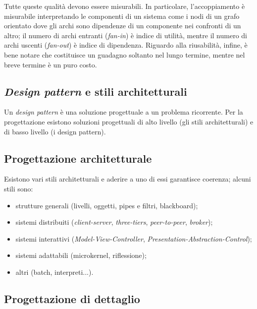 \documentclass[a4paper]{article}
\begin{document}
		
Tutte queste qualità devono essere misurabili. In particolare, l'accoppiamento è misurabile interpretando le componenti di un sistema come i nodi di un grafo orientato dove gli archi sono dipendenze di un componente nei confronti di un altro; il numero di archi entranti (\emph{fan-in}) è indice di utilità, mentre il numero di archi uscenti (\emph{fan-out}) è indice di dipendenza. Riguardo alla riusabilità, infine, è bene notare che costituisce un guadagno soltanto nel lungo termine, mentre nel breve termine è un puro costo.

		
	\subsection{\emph{Design pattern} e stili architetturali}

		
Un \emph{design pattern} è una soluzione progettuale a un problema ricorrente. Per la progettazione esistono soluzioni progettuali di alto livello (gli stili architetturali) e di basso livello (i design pattern).

		
	\subsection{Progettazione architetturale}

		
Esistono vari stili architetturali e aderire a uno di essi garantisce coerenza; alcuni stili sono:
		
	\begin{itemize}
		
			
	\item strutture generali (livelli, oggetti, pipes e filtri, blackboard);
			
	\item sistemi distribuiti (\emph{client-server}, \emph{three-tiers}, \emph{peer-to-peer}, \emph{broker});
			
	\item sistemi interattivi (\emph{Model-View-Controller}, \emph{Presentation-Abstraction-Control});
			
	\item sistemi adattabili (microkernel, riflessione);
			
	\item altri (batch, interpreti...).
		
	\end{itemize}


		
	\subsection{Progettazione di dettaglio}
\end{document}
